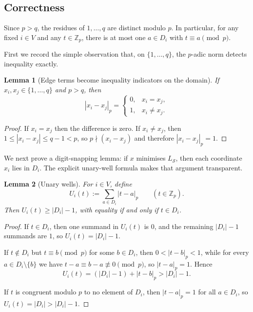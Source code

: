 \documentclass[11pt]{article}
\newtheorem{lemma}{Lemma}
\begin{document}
\subsection{Correctness}
Since \(p>q\), the residues of \(1,\dots,q\) are distinct modulo \(p\). In particular, for any fixed \(i\in V\) and any \(t\in\mathbb Z_p\), there is at most one \(a\in D_i\) with \(t\equiv a\pmod p\).

First we record the simple observation that, on \(\{1,\dots,q\}\), the \(p\)-adic norm detects inequality exactly.

\begin{lemma}[Edge terms become inequality indicators on the domain]
\label{lem:edge-indicator}
If \(x_i,x_j\in \{1,\dots,q\}\) and \(p>q\), then
\[
|x_i-x_j|_p=
\begin{cases}
0,&x_i=x_j,\\
1,&x_i\neq x_j.
\end{cases}
\]
\end{lemma}

\begin{proof}
If \(x_i=x_j\) then the difference is zero. If \(x_i\neq x_j\), then \(1\le |x_i-x_j|\le q-1<p\), so \(p\nmid (x_i-x_j)\) and therefore \(|x_i-x_j|_p=1\).
\end{proof}

We next prove a digit-snapping lemma: if \(x\) minimises \(L_{\mathcal S}\), then each coordinate \(x_i\) lies in \(D_i\). The explicit unary-well formula makes that argument transparent.

\begin{lemma}[Unary wells]
\label{lem:unary-well}
For \(i\in V\), define
\[
U_i(t):=\sum_{a\in D_i}|t-a|_p
\qquad (t\in\mathbb Z_p).
\]
Then \(U_i(t)\ge |D_i|-1\), with equality if and only if \(t\in D_i\).
\end{lemma}

\begin{proof}
If \(t\in D_i\), then one summand in \(U_i(t)\) is \(0\), and the remaining \(|D_i|-1\) summands are \(1\), so \(U_i(t)=|D_i|-1\).

If \(t\notin D_i\) but \(t\equiv b \pmod p\) for some \(b\in D_i\), then \(0<|t-b|_p<1\), while for every \(a\in D_i\setminus\{b\}\) we have \(t-a\equiv b-a\not\equiv 0\pmod p\), so \(|t-a|_p=1\). Hence
\[
U_i(t)=(|D_i|-1)+|t-b|_p > |D_i|-1.
\]

If \(t\) is congruent modulo \(p\) to no element of \(D_i\), then \(|t-a|_p=1\) for all \(a\in D_i\), so \(U_i(t)=|D_i|>|D_i|-1\).
\end{proof}
\end{document}
